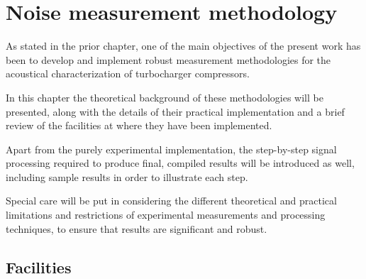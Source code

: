 \chapter{Noise measurement methodology} \label{cap:metod}



\noindent As stated in the prior chapter, one of the main objectives of the present work has been to develop and implement robust measurement methodologies for the acoustical characterization of turbocharger compressors.

In this chapter the theoretical background of these methodologies will be presented, along with the details of their practical implementation and a brief review of the facilities at where they have been implemented.

Apart from the purely experimental implementation, the step-by-step signal processing required to produce final, compiled results will be introduced as well, including sample results in order to illustrate each step.

Special care will be put in considering the different theoretical and practical limitations and restrictions of experimental measurements and processing techniques, to ensure that results are significant and robust.

\section{Facilities} %

